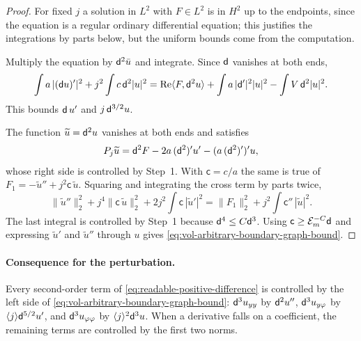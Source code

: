 \begin{proof}
For fixed $j$ a solution in $L^2$ with $F\in L^2$ is in $H^2$ up to
the endpoints, since the equation is a regular ordinary differential
equation; this justifies the integrations by parts below, but the
uniform bounds come from the computation.

Multiply the equation by $\mathsf d^2\bar u$ and integrate. Since $\mathsf d$
vanishes at both ends,
\[
 \int a\,|(\mathsf d u)'|^2+j^2\int c\,\mathsf d^2|u|^2
 =\operatorname{Re}\langle F,\mathsf d^2u\rangle
       +\int a\,|\mathsf d'|^2|u|^2-\int V\,\mathsf d^2|u|^2 .
\]
This bounds $\mathsf d\,u'$ and $j\,\mathsf d^{3/2}u$.

The function $\widetilde u=\mathsf d^2u$ vanishes at both ends and satisfies
\[
 P_j\widetilde u=\mathsf d^2F-2a\,(\mathsf d^2)'u'-(a\,(\mathsf d^2)')'u ,
\]
whose right side is controlled by Step~1. With $\mathsf c=c/a$ the
same is true of
$F_1=-\widetilde u''+j^2\mathsf c\,\widetilde u$. Squaring and
integrating the cross term by parts twice,
\[
 \|\widetilde u''\|_2^2+j^4\|\mathsf c\,\widetilde u\|_2^2
 +2j^2\int\mathsf c\,|\widetilde u'|^2
 =\|F_1\|_2^2+j^2\int\mathsf c''\,|\widetilde u|^2 .
\]
The last integral is controlled by Step~1 because
$\mathsf d^4\le C\mathsf d^3$. Using $\mathsf c\ge\mathcal E_m^{-C}\mathsf d$ and
expressing $\widetilde u'$ and $\widetilde u''$ through $u$ gives
\eqref{eq:vol-arbitrary-boundary-graph-bound}.
\end{proof}

\paragraph{Consequence for the perturbation.}
Every second-order term of \eqref{eq:readable-positive-difference} is
controlled by the left side of
\eqref{eq:vol-arbitrary-boundary-graph-bound}: $\mathsf d^3u_{yy}$ by
$\mathsf d^2u''$, $\mathsf d^3u_{y\varphi}$ by
$\langle j\rangle\mathsf d^{5/2}u'$, and $\mathsf d^3u_{\varphi\varphi}$ by
$\langle j\rangle^2\mathsf d^3u$. When a derivative falls on a coefficient,
the remaining terms are controlled by the first two norms.

